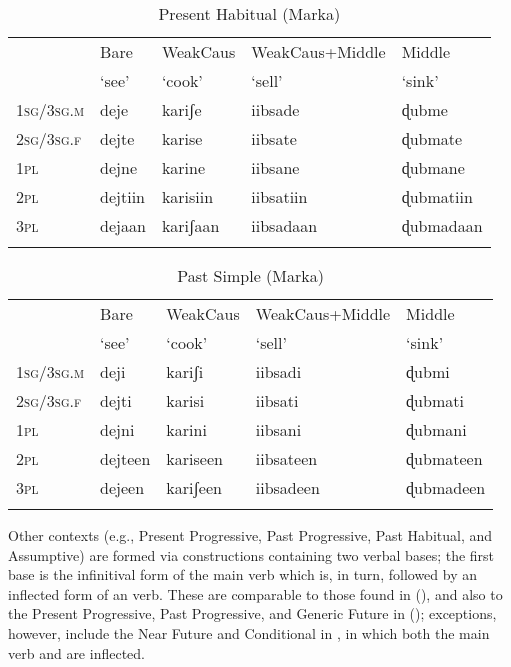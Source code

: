 \documentclass[output=paper,modfonts,nonflat,
hidelinks
]{langsci/langscibook}
\begin{document}
 \begin{table}
 	\caption{{Present Habitual (Marka)}}
 	\label{tab:1:Present Habitual}
 	\begin{tabularx}{\textwidth}{Xllll} 
 		\lsptoprule
 		& Bare   & WeakCaus  & WeakCaus+Middle & Middle   \\
 		& `see' & `cook' & `sell' & `sink' \\ 
 		\midrule
 		1\textsc{sg}/3\textsc{sg.m} & deje & kariʃe & iibsade & ɖubme \\
 		2\textsc{sg}/3\textsc{sg.f} & dejte  & karise & iibsate  & ɖubmate  \\
 		1\textsc{pl} & dejne & karine & iibsane & ɖubmane \\
 		2\textsc{pl} & dejtiin & karisiin & iibsatiin & ɖubmatiin \\
 		3\textsc{pl} & dejaan & kariʃaan & iibsadaan & ɖubmadaan \\
 	
 		\lspbottomrule
 	\end{tabularx}
 \end{table}
 
 \begin{table}
 	\caption{{Past Simple (Marka)}}
 	\label{tab:1:Past Simple}
 	\begin{tabularx}{\textwidth}{Xllll} 
 		\lsptoprule
 		& Bare   & WeakCaus  & WeakCaus+Middle & Middle   \\
 		& `see' & `cook' & `sell' & `sink' \\ 
 		\midrule
 		1\textsc{sg}/3\textsc{sg.m} & deji & kariʃi & iibsadi & ɖubmi \\
 		2\textsc{sg}/3\textsc{sg.f} & dejti  & karisi & iibsati  & ɖubmati  \\
 		1\textsc{pl} & dejni & karini & iibsani & ɖubmani \\
 		2\textsc{pl} & dejteen & kariseen & iibsateen & ɖubmateen \\
 		3\textsc{pl} & dejeen & kariʃeen & iibsadeen & ɖubmadeen \\
 		\lspbottomrule
 	\end{tabularx}
 \end{table}
 
 Other contexts (e.g., Present Progressive, Past Progressive, Past Habitual, and Assumptive) are formed via  constructions containing two verbal bases; the first base is the infinitival form of the main verb which is, in turn, followed by an inflected form of an  verb. These are comparable to those found in  (\citealt{Greenetal2015}), and also to the Present Progressive, Past Progressive, and Generic Future in  (\citealt{PasterRanero2015}); exceptions, however, include the Near Future and Conditional in , in which both the main verb and  are inflected.
 
\end{document}
